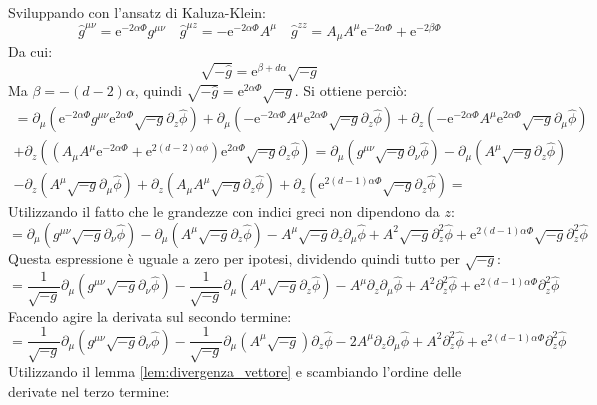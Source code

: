 \documentclass[]{scrartcl}
\newcommand{\me}{\mathrm{e}}
\newcommand{\pd}{\partial}
\newcommand{\sg}{\sqrt{-g}}
\newcommand{\hg}{\hat{g}}
\begin{document}
Sviluppando con l'ansatz di Kaluza-Klein:
\[
  \hg^{\mu\nu} = \me^{-2 \alpha \Phi} g^{\mu\nu} \quad
  \hg^{\mu z} = -\me^{-2 \alpha \Phi} A^\mu \quad
  \hg^{z z} = A_\mu A^\mu \me^{-2 \alpha \Phi} + \me^{-2\beta \Phi}
\]
Da cui:
\[
  \sqrt{-\hg} = \me^{\beta + d\alpha}\sg
\]
Ma $ \beta = - (d -2)\alpha $, quindi $ \sqrt{-\hg} = \me^{2\alpha\Phi}\sg $.
Si ottiene perciò:
\begin{gather*}
 = {}   \pd_\mu (\me^{-2\alpha\Phi} g^{\mu\nu} \me^{2\alpha\Phi} \sg \pd_z \hat{\phi} ) + \pd_\mu (-\me^{-2\alpha\Phi}A^\mu \me^{2\alpha\Phi} \sg \pd_z \hat{\phi} )  +  \pd_z (-\me^{-2\alpha\Phi} A^\mu \me^{2\alpha\Phi} \sg \pd_\mu \hat{\phi} )       \\
       + \pd_z \left((A_\mu A^\mu\me^{-2\alpha\Phi} + \me^{2(d-2)\alpha\phi})\me^{2\alpha\Phi} \sg \pd_z \hat{\phi} \right)  = \pd_\mu (g^{\mu\nu}\sg\pd_\nu \hat{\phi}) - \pd_\mu (A^\mu \sg \pd_z \hat{\phi})  \\
    - \pd_z (A^\mu \sg\pd_\mu \hat{\phi}) + \pd_z (A_\mu A^\mu \sg\pd_z \hat{\phi})     + \pd_z (\me^{2(d-1)\alpha\Phi}\sg\pd_z\hat{\phi})  =
\end{gather*}
Utilizzando il fatto che le grandezze con indici greci non dipendono da $ z $:
\[
  = \pd_\mu (g^{\mu\nu}\sg\pd_\nu \hat{\phi}) - \pd_\mu(A^\mu \sg \pd_z \hat{\phi})
  - A^\mu\sg \pd_z \pd_\mu \hat{\phi} + A^2 \sg \pd_z^2 \hat{\phi} +                                                                                                                                           \me^{2(d-1)\alpha\Phi} \sg \pd_z^2 \hat{\phi}
\]
Questa espressione è uguale a zero per ipotesi, dividendo quindi tutto per $ \sg $:
\[
  = \frac{1}{\sg}\pd_\mu (g^{\mu\nu}\sg\pd_\nu \hat{\phi}) -  \frac{1}{\sg} \pd_\mu(A^\mu \sg \pd_z \hat{\phi})
  - A^\mu \pd_z \pd_\mu \hat{\phi} + A^2 \pd_z^2 \hat{\phi} + \me^{2(d-1)\alpha\Phi} \pd_z^2 \hat{\phi}
\]
Facendo agire la derivata sul secondo termine:
\[
  = \frac{1}{\sg}\pd_\mu (g^{\mu\nu}\sg\pd_\nu \hat{\phi}) -  \frac{1}{\sg} \pd_\mu(A^\mu \sg) \pd_z \hat{\phi}
  - 2A^\mu \pd_z \pd_\mu \hat{\phi} + A^2 \pd_z^2 \hat{\phi} + \me^{2(d-1)\alpha\Phi} \pd_z^2 \hat{\phi}
\]
Utilizzando il lemma \ref{lem:divergenza_vettore} e scambiando l'ordine delle derivate nel terzo termine:
\end{document}
